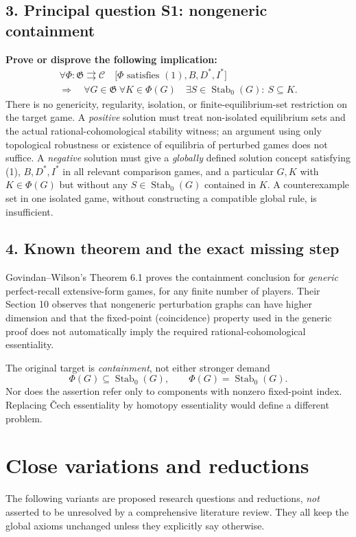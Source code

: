 \documentclass[11pt]{article}
\newcommand{\Stab}{\operatorname{Stab}_0}
\newcommand{\CC}{\mathcal C}
\begin{document}
\subsection*{3. Principal question S1: nongeneric containment}
\noindent\textbf{Prove or disprove the following implication:}
\[
 \boxed{\begin{gathered}
 \forall\Phi:\mathfrak G\rightrightarrows\CC\quad
 \bigl[\Phi\text{ satisfies }(1),B,D^*,I^*\bigr]\\[-2pt]
 \Longrightarrow\quad
 \forall G\in\mathfrak G\ \forall K\in\Phi(G)\quad
 \exists S\in\Stab(G):\ S\subseteq K.
 \end{gathered}}
 \tag{S1}\label{eq:S1}
\]
There is no genericity, regularity, isolation, or finite-equilibrium-set
restriction on the target game. A \emph{positive} solution must treat
non-isolated equilibrium sets and the actual rational-cohomological
stability witness; an argument using only topological robustness or
existence of equilibria of perturbed games does not suffice.
A \emph{negative} solution must give a \emph{globally} defined
solution concept satisfying (1), $B,D^*,I^*$ in all relevant comparison
games, and a particular $G,K$ with $K\in\Phi(G)$ but without any
$S\in\Stab(G)$ contained in $K$. A counterexample set in one isolated
game, without constructing a compatible global rule, is insufficient.

\subsection*{4. Known theorem and the exact missing step}
Govindan--Wilson's Theorem 6.1 proves the containment conclusion for
\emph{generic} perfect-recall extensive-form games, for any finite
number of players. Their Section 10 observes that nongeneric
perturbation graphs can have higher dimension and that the fixed-point
(coincidence) property used in the generic proof does not automatically
imply the required rational-cohomological essentiality.

The original target is \emph{containment}, not either stronger demand
\[
 \Phi(G)\subseteq\Stab(G),\qquad
 \Phi(G)=\Stab(G).
\]
Nor does the assertion refer only to components with nonzero
fixed-point index. Replacing \v Cech essentiality by homotopy
essentiality would define a different problem.

\section*{Close variations and reductions}
The following variants are proposed research questions and reductions,
\emph{not} asserted to be unresolved by a comprehensive literature review.
They all keep the global axioms unchanged unless they explicitly say
otherwise.
\end{document}
